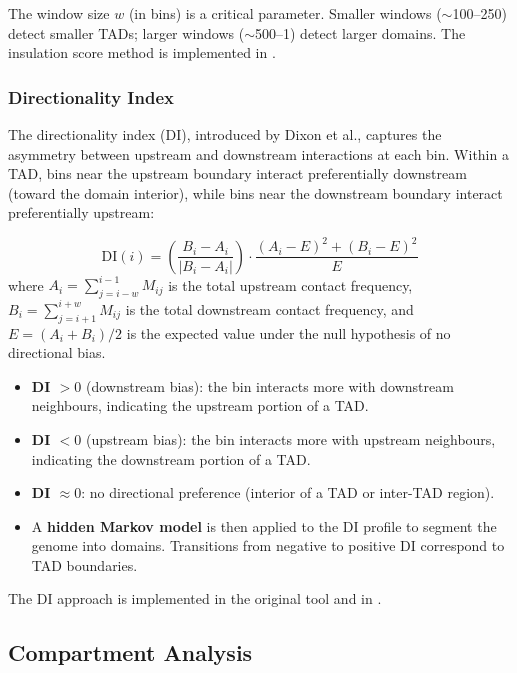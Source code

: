 The window size $w$ (in bins) is a critical parameter. Smaller windows ($\sim$100--250\kilobase{}) detect smaller TADs; larger windows ($\sim$500\kilobase{}--1\megabase{}) detect larger domains. The insulation score method is implemented in .

\subsubsection{Directionality Index}
\label{subsubsec:3dgenome:di}

The directionality index (DI), introduced by Dixon et al., captures the asymmetry between upstream and downstream interactions at each bin. Within a TAD, bins near the upstream boundary interact preferentially downstream (toward the domain interior), while bins near the downstream boundary interact preferentially upstream:

\begin{equation}
\label{eq:3dgenome:di}
\text{DI}(i) = \left(\frac{B_i - A_i}{|B_i - A_i|}\right) \cdot \frac{(A_i - E)^2 + (B_i - E)^2}{E}
\end{equation}
where $A_i = \sum_{j=i-w}^{i-1} M_{ij}$ is the total upstream contact frequency, $B_i = \sum_{j=i+1}^{i+w} M_{ij}$ is the total downstream contact frequency, and $E = (A_i + B_i)/2$ is the expected value under the null hypothesis of no directional bias.

\begin{itemize}[itemsep=2pt]
  \item \textbf{DI $> 0$} (downstream bias): the bin interacts more with downstream neighbours, indicating the upstream portion of a TAD.
  \item \textbf{DI $< 0$} (upstream bias): the bin interacts more with upstream neighbours, indicating the downstream portion of a TAD.
  \item \textbf{DI $\approx 0$}: no directional preference (interior of a TAD or inter-TAD region).
  \item A \textbf{hidden Markov model} is then applied to the DI profile to segment the genome into domains. Transitions from negative to positive DI correspond to TAD boundaries.
\end{itemize}

The DI approach is implemented in the original  tool and in .

\subsection{Compartment Analysis}
\label{subsec:3dgenome:compartment-analysis}

